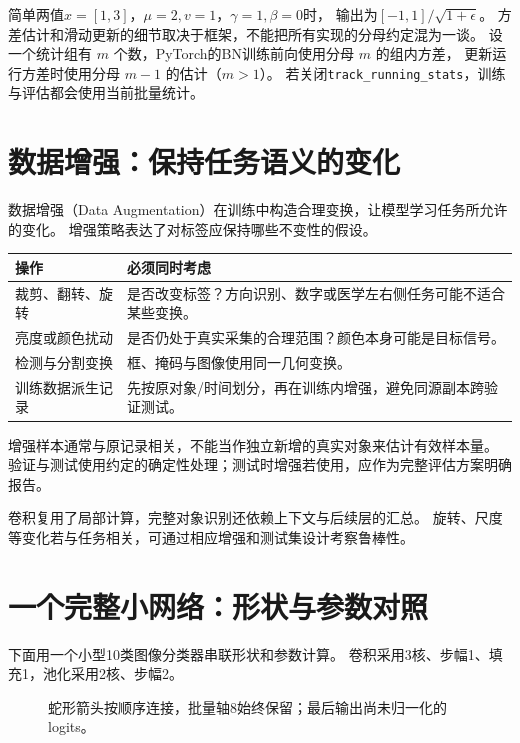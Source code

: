 简单两值$x=[1,3]$，$\mu=2,v=1$，$\gamma=1,\beta=0$时，
输出为$[-1,1]/\sqrt{1+\epsilon}$。
方差估计和滑动更新的细节取决于框架，不能把所有实现的分母约定混为一谈。
设一个统计组有 $m$ 个数，PyTorch的BN训练前向使用分母 $m$ 的组内方差，
更新运行方差时使用分母 $m-1$ 的估计（$m>1$）。
若关闭\texttt{track\_running\_stats}，训练与评估都会使用当前批量统计。


\section{数据增强：保持任务语义的变化}
\label{sec:cnn-augmentation}
数据增强（Data Augmentation）在训练中构造合理变换，让模型学习任务所允许的变化。
增强策略表达了对标签应保持哪些不变性的假设。

\begin{center}
\begin{tabularx}{\textwidth}{P{33mm}Y}
\toprule
操作 & 必须同时考虑\\
\midrule
裁剪、翻转、旋转 & 是否改变标签？方向识别、数字或医学左右侧任务可能不适合某些变换。\\
亮度或颜色扰动 & 是否仍处于真实采集的合理范围？颜色本身可能是目标信号。\\
检测与分割变换 & 框、掩码与图像使用同一几何变换。\\
训练数据派生记录 & 先按原对象/时间划分，再在训练内增强，避免同源副本跨验证测试。\\
\bottomrule
\end{tabularx}
\end{center}

增强样本通常与原记录相关，不能当作独立新增的真实对象来估计有效样本量。
验证与测试使用约定的确定性处理；测试时增强若使用，应作为完整评估方案明确报告。

卷积复用了局部计算，完整对象识别还依赖上下文与后续层的汇总。
旋转、尺度等变化若与任务相关，可通过相应增强和测试集设计考察鲁棒性。

\section{一个完整小网络：形状与参数对照}
\label{sec:cnn-example}
下面用一个小型10类图像分类器串联形状和参数计算。
卷积采用3核、步幅1、填充1，池化采用2核、步幅2。

\begin{figure}[htbp]
\centering
\caption{蛇形箭头按顺序连接，批量轴8始终保留；最后输出尚未归一化的logits。}
\par\smallskip
{}
\end{figure}

